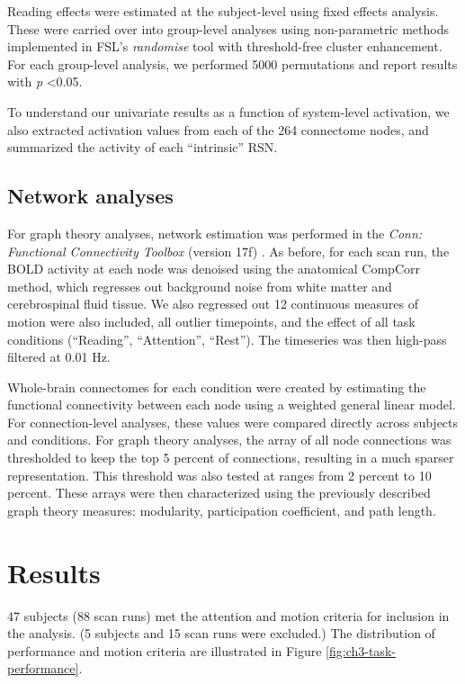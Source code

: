 Reading effects were estimated at the subject-level using fixed effects analysis. These were carried over into group-level analyses using non-parametric methods implemented in FSL’s \textit{randomise} tool with threshold-free cluster enhancement. For each group-level analysis, we performed 5000 permutations and report results with \textit{p} \textless 0.05. 

To understand our univariate results as a function of system-level activation, we also extracted activation values from each of the 264 connectome nodes, and summarized the activity of each ``intrinsic'' RSN.

\subsection{Network analyses}

For graph theory analyses, network estimation was performed in the \textit{Conn: Functional Connectivity Toolbox} (version 17f) \citep{WhitfieldGabrieli2012}. As before, for each scan run, the BOLD activity at each node was denoised using the anatomical CompCorr method, which regresses out background noise from white matter and cerebrospinal fluid tissue. We also regressed out 12 continuous measures of motion were also included, all outlier timepoints, and the effect of all task conditions (``Reading'', ``Attention'', ``Rest''). The timeseries was then high-pass filtered at 0.01 Hz.

Whole-brain connectomes for each condition were created by estimating the functional connectivity between each node using a weighted general linear model. For connection-level analyses, these values were compared directly across subjects and conditions. For graph theory analyses, the array of all node connections was thresholded to keep the top 5 percent of connections, resulting in a much sparser representation. This threshold was also tested at ranges from 2 percent to 10 percent. These arrays were then characterized using the previously described graph theory measures: modularity, participation coefficient, and path length.


\section{Results}

47 subjects (88 scan runs) met the attention and motion criteria for inclusion in the analysis. (5 subjects and 15 scan runs were excluded.) The distribution of performance and motion criteria are illustrated in Figure \ref{fig:ch3-task-performance}. 

